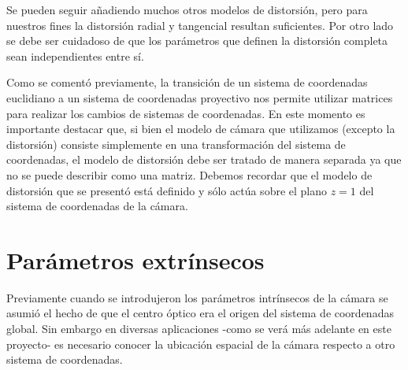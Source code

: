 
Se pueden seguir añadiendo muchos otros modelos de distorsión, pero para nuestros fines la distorsión radial y tangencial resultan suficientes. Por otro lado se debe ser cuidadoso de que los parámetros que definen la distorsión completa sean independientes entre sí.

Como se comentó previamente, la transición de un sistema de coordenadas euclidiano a un sistema de coordenadas proyectivo nos permite utilizar matrices para realizar los cambios de sistemas de coordenadas. En este momento es importante destacar que, si bien el modelo de cámara que utilizamos (excepto la distorsión) consiste simplemente en una transformación del sistema de coordenadas, el modelo de distorsión debe ser tratado de manera separada ya que no se puede describir como una matriz. Debemos recordar que el modelo de distorsión que se presentó está definido y sólo actúa sobre el plano $z=1$ del sistema de coordenadas de la cámara.

\section{Parámetros extrínsecos}

Previamente cuando se introdujeron los parámetros intrínsecos de la cámara se asumió el hecho de que el centro óptico era el origen del sistema de coordenadas global. Sin embargo en diversas aplicaciones -como se verá más adelante en este proyecto- es necesario conocer la ubicación espacial de la cámara respecto a otro sistema de coordenadas. 


